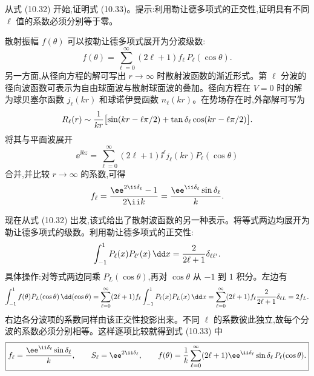 \begin{question}
从式 (10.32) 开始,证明式 (10.33)。提示:利用勒让德多项式的正交性,证明具有不同 $\ell$ 值的系数必须分别等于零。

\par\smallskip
{}

\end{question}
\begin{solution}
散射振幅 $f(\theta)$ 可以按勒让德多项式展开为分波级数:
\[
f(\theta)=\sum_{\ell=0}^{\infty}(2\ell+1)f_\ell\,P_\ell(\cos\theta).
\]
另一方面,从径向方程的解可写出 $r\to\infty$ 时散射波函数的渐近形式。第 $\ell$ 分波的径向波函数可表示为自由球面波与散射球面波的叠加。径向方程在 $V=0$ 时的解为球贝塞尔函数 $j_\ell(kr)$ 和球诺伊曼函数 $n_\ell(kr)$。在势场存在时,外部解可写为
\[
R_\ell(r)\sim {1\over kr}\bigl[\sin(kr-\ell\pi/2)+\tan\delta_\ell\cos(kr-\ell\pi/2)\bigr].
\]
将其与平面波展开
\[
\ee^{\ii kz}=\sum_{\ell=0}^{\infty}(2\ell+1)\ii^\ell j_\ell(kr)P_\ell(\cos\theta)
\]
合并,并比较 $r\to\infty$ 的系数,可得
\[
f_\ell={\ee^{2\ii\delta_\ell}-1\over2\ii k}={\ee^{\ii\delta_\ell}\sin\delta_\ell\over k}.
\]

现在从式 (10.32) 出发,该式给出了散射波函数的另一种表示。将等式两边均展开为勒让德多项式的级数。利用勒让德多项式的正交性:
\[
\int_{-1}^{1}P_\ell(x)P_{\ell'}(x)\,\dd x={2\over2\ell+1}\delta_{\ell\ell'}.
\]
具体操作:对等式两边同乘 $P_L(\cos\theta)$,再对 $\cos\theta$ 从 $-1$ 到 $1$ 积分。左边有
\[
\int_{-1}^1 f(\theta)P_L(\cos\theta)\,\dd(\cos\theta)
=\sum_{\ell=0}^\infty(2\ell+1)f_\ell\int_{-1}^1 P_\ell(x)P_L(x)\,\dd x
=\sum_{\ell=0}^\infty(2\ell+1)f_\ell{2\over2\ell+1}\delta_{\ell L}=2f_L.
\]
右边各分波项的系数同样由该正交性投影出来。不同 $\ell$ 的系数彼此独立,故每个分波的系数必须分别相等。这样逐项比较就得到式 (10.33) 中
\[
\boxed{f_\ell={\ee^{\ii\delta_\ell}\sin\delta_\ell\over k},\qquad S_\ell=\ee^{2\ii\delta_\ell},\qquad f(\theta)={1\over k}\sum_{\ell=0}^\infty(2\ell+1)\ee^{\ii\delta_\ell}\sin\delta_\ell\,P_\ell(\cos\theta).}
\]
\end{solution}

